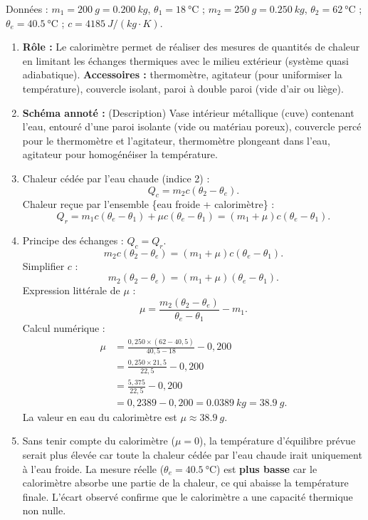 \documentclass[11pt]{article}
\begin{document}
\begin{corrige}
Données : $m_1 = \SI{200}{g} = \SI{0,200}{kg}$, $\theta_1 = \SI{18}{\degreeCelsius}$ ; $m_2 = \SI{250}{g} = \SI{0,250}{kg}$, $\theta_2 = \SI{62}{\degreeCelsius}$ ; $\theta_e = \SI{40,5}{\degreeCelsius}$ ; $c = \SI{4185}{J/(kg\cdot K)}$.
\begin{enumerate}
\item \textbf{Rôle :} Le calorimètre permet de réaliser des mesures de quantités de chaleur en limitant les échanges thermiques avec le milieu extérieur (système quasi adiabatique).
  \textbf{Accessoires :} thermomètre, agitateur (pour uniformiser la température), couvercle isolant, paroi à double paroi (vide d'air ou liège).
\item \textbf{Schéma annoté :} (Description) Vase intérieur métallique (cuve) contenant l'eau, entouré d'une paroi isolante (vide ou matériau poreux), couvercle percé pour le thermomètre et l'agitateur, thermomètre plongeant dans l'eau, agitateur pour homogénéiser la température.
\item Chaleur cédée par l'eau chaude (indice 2) :
  \[
  Q_c = m_2 c (\theta_2 - \theta_e).
  \]
  Chaleur reçue par l'ensemble \{eau froide + calorimètre\} :
  \[
  Q_r = m_1 c (\theta_e - \theta_1) + \mu c (\theta_e - \theta_1) = (m_1 + \mu) c (\theta_e - \theta_1).
  \]
\item Principe des échanges : $Q_c = Q_r$.
  \[
  m_2 c (\theta_2 - \theta_e) = (m_1 + \mu) c (\theta_e - \theta_1).
  \]
  Simplifier $c$ :
  \[
  m_2 (\theta_2 - \theta_e) = (m_1 + \mu) (\theta_e - \theta_1).
  \]
  Expression littérale de $\mu$ :
  \[
  \mu = \frac{m_2 (\theta_2 - \theta_e)}{\theta_e - \theta_1} - m_1.
  \]
  Calcul numérique :
  \begin{align*}
  \mu &= \frac{0,250 \times (62 - 40,5)}{40,5 - 18} - 0,200 \\
      &= \frac{0,250 \times 21,5}{22,5} - 0,200 \\
      &= \frac{5,375}{22,5} - 0,200 \\
      &= 0,2389 - 0,200 = \SI{0,0389}{kg} = \SI{38,9}{g}.
  \end{align*}
  La valeur en eau du calorimètre est \textbf{$\mu \approx \SI{38,9}{g}$}.
\item Sans tenir compte du calorimètre ($\mu = 0$), la température d'équilibre prévue serait plus élevée car toute la chaleur cédée par l'eau chaude irait uniquement à l'eau froide. La mesure réelle ($\theta_e = \SI{40,5}{\degreeCelsius}$) est \textbf{plus basse} car le calorimètre absorbe une partie de la chaleur, ce qui abaisse la température finale. L'écart observé confirme que le calorimètre a une capacité thermique non nulle.

\end{enumerate}
\end{corrige}
\end{document}
